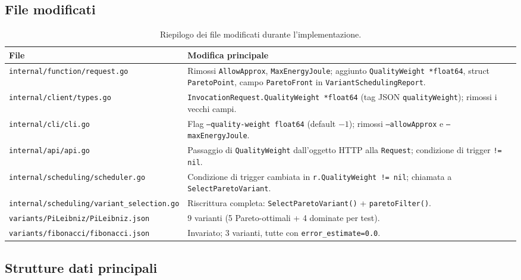 \documentclass[a4paper,12pt]{article}
\begin{document}
\subsection{File modificati}

\begin{table}[H]
\centering
\caption{Riepilogo dei file modificati durante l'implementazione.}
\begin{tabular}{@{}lp{9cm}@{}}
\toprule
\textbf{File} & \textbf{Modifica principale} \\
\midrule
\texttt{internal/function/request.go}
  & Rimossi \texttt{AllowApprox}, \texttt{MaxEnergyJoule};
    aggiunto \texttt{QualityWeight *float64},
    struct \texttt{ParetoPoint}, campo \texttt{ParetoFront} in
    \texttt{VariantSchedulingReport}. \\
\addlinespace
\texttt{internal/client/types.go}
  & \texttt{InvocationRequest.QualityWeight *float64} (tag JSON
    \texttt{qualityWeight}); rimossi i vecchi campi. \\
\addlinespace
\texttt{internal/cli/cli.go}
  & Flag \texttt{--quality-weight float64} (default $-1$);
    rimossi \texttt{--allowApprox} e \texttt{--maxEnergyJoule}. \\
\addlinespace
\texttt{internal/api/api.go}
  & Passaggio di \texttt{QualityWeight} dall'oggetto HTTP alla
    \texttt{Request}; condizione di trigger \texttt{!= nil}. \\
\addlinespace
\texttt{internal/scheduling/scheduler.go}
  & Condizione di trigger cambiata in
    \texttt{r.QualityWeight != nil};
    chiamata a \texttt{SelectParetoVariant}. \\
\addlinespace
\texttt{internal/scheduling/variant\_selection.go}
  & Riscrittura completa: \texttt{SelectParetoVariant()} +
    \texttt{paretoFilter()}. \\
\addlinespace
\texttt{variants/PiLeibniz/PiLeibniz.json}
  & 9 varianti (5 Pareto-ottimali + 4 dominate per test). \\
\addlinespace
\texttt{variants/fibonacci/fibonacci.json}
  & Invariato; 3 varianti, tutte con \texttt{error\_estimate=0.0}. \\
\bottomrule
\end{tabular}
\end{table}

\subsection{Strutture dati principali}
\end{document}
